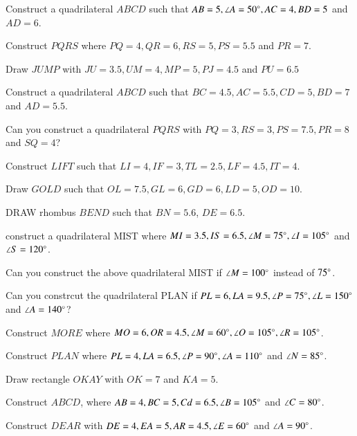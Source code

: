 

\item Construct a quadrilateral $ABCD$ such that $AB=5, \angle A = 50\degree, AC = 4, BD = 5$ and $AD = 6$.
\\
\solution 

\item Construct $PQRS$ where $PQ = 4, QR = 6, RS = 5, PS = 5.5$ and $PR = 7$.
\item Draw $JUMP$ with $JU = 3.5, UM=4, MP = 5, PJ =4.5$ and $PU = 6.5$
\item Construct a quadrilateral $ABCD$ such that $BC=4.5,  AC = 5.5, CD = 5, BD = 7$ and $AD = 5.5$.
\item Can you construct a quadrilateral $PQRS$ with $PQ=3, RS=3, PS=7.5, PR=8$ and $SQ=4$?
\\
\solution 

\item Construct $LIFT$ such that $LI = 4, IF = 3, TL = 2.5, LF = 4.5, IT=4$.
\item Draw $GOLD$ such that $OL=7.5, GL=6, GD=6, LD = 5, OD = 10$.
\\
\solution 


\item DRAW rhombus $BEND$ such that $BN = 5.6$, $DE = 6.5$.
\item construct a quadrilateral MIST where $MI = 3.5, IS = 6.5, \angle M = 75 \degree, \angle I = 105 \degree$ and $\angle S = 120 \degree$.
\item Can you construct the above quadrilateral MIST if $\angle M = 100 \degree$ instead of $75 \degree$.
\item Can you constrcut the quadrilateral PLAN if $PL = 6, LA = 9.5, \angle P = 75 \degree, \angle L = 150 \degree$ and $\angle A = 140 \degree$?
\item Construct $MORE$ where $MO = 6, OR = 4.5, \angle M = 60 \degree, \angle O = 105 \degree, \angle R = 105 \degree$.
\item Construct $PLAN$ where $PL = 4, LA = 6.5, \angle P = 90 \degree, \angle A = 110\degree$ and $\angle N = 85\degree$.
\item Draw  rectangle $OKAY$ with $OK = 7$ and $KA = 5$.
\item Construct $ABCD $, where $AB = 4, BC = 5, Cd = 6.5, \angle B = 105 \degree$ and $\angle C = 80\degree$.
\\
\solution 

%
\item Construct $DEAR$ with $DE = 4, EA = 5, AR = 4.5, \angle E = 60 \degree$ and $\angle A = 90 \degree$.
\\
\solution 



